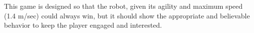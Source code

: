 
This game is designed so that the robot, given its agility and maximum speed (1.4 m/sec) could always win, but it should show the appropriate and believable behavior to keep the player engaged and interested. %


